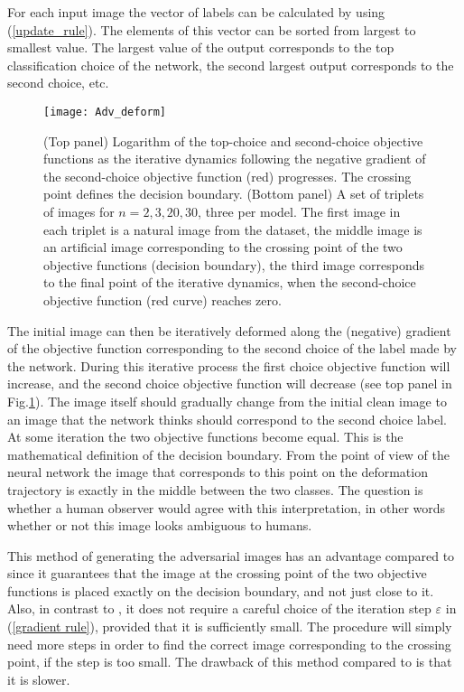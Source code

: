 \documentclass[12pt]{article} %
\begin{document}
For each input image the vector of labels can be calculated by using (\ref{update_rule}). The elements of this vector can be sorted from largest to smallest value. The largest value of the output corresponds to the top classification choice of the network, the second largest output corresponds to the second choice, etc. 
\begin{figure}[h]
\begin{center}
\texttt{[image: Adv\_deform]}
\end{center}
\caption{\footnotesize{(Top panel) Logarithm of the top-choice and second-choice objective functions as the iterative dynamics following the negative gradient of the second-choice objective function (red) progresses. The crossing point defines the decision boundary. (Bottom panel) A set of triplets of images for $n=2, 3, 20, 30$, three per model. The first image in each triplet is a natural image from the dataset, the middle image is an artificial image corresponding to the crossing point of the two objective functions (decision boundary), the third image corresponds to the final point of the iterative dynamics, when the second-choice objective function (red curve) reaches zero.}}\label{adv_deform}
\end{figure}
The initial image can then be iteratively deformed along the (negative) gradient of the objective function corresponding to the second choice of the label made by the network. During this iterative process the first choice objective function will increase, and the second choice objective function will decrease (see top panel in Fig.\ref{adv_deform}). The image itself should gradually change from the initial clean image to an image that the network thinks should correspond to the second choice label. At some iteration the two objective functions become equal. This is the mathematical definition of the decision boundary. From the point of view of the neural network the image that corresponds to this point on the deformation trajectory is exactly in the middle between the two classes. The question is whether a human observer would agree with this interpretation, in other words whether or not this image looks ambiguous to humans. 


 This method of generating the adversarial images has an advantage compared to \cite{sign gradient} since it guarantees that the image at the crossing point of the two objective functions is placed exactly on the decision boundary, and not just close to it. Also, in contrast to \cite{sign gradient}, it does not require a careful choice of the iteration step $\varepsilon$ in (\ref{gradient rule}), provided that it is sufficiently small. The procedure will simply need more steps in order to find the correct image corresponding to the crossing point, if the step is too small. The drawback of this method compared to \cite{sign gradient} is that it is slower. 
\end{document}
